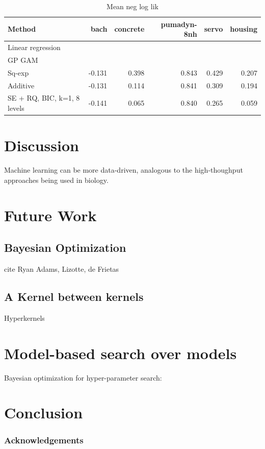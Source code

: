 \documentclass[twoside]{article}
\theoremstyle{definition}
\theoremstyle{remark}
\numberwithin{equation}{section}
\numberwithin{thm}{section}
\begin{document}
\begin{table}[h!]
\begin{center}
\begin{tabular}{l | r r r r r}
Method & bach & concrete & pumadyn-8nh & servo & housing \\
\hline
Linear regression & & & & & \\
GP GAM & & & & & \\
Sq-exp & -0.131 & 0.398 & 0.843 & 0.429 & 0.207 \\
Additive & -0.131 & 0.114 & 0.841 & 0.309 & 0.194 \\
\hline
SE + RQ, BIC, k=1, 8 levels & -0.141 & 0.065 & 0.840 & 0.265 & 0.059\\
\end{tabular}
\caption{Mean neg log lik}
\end{center}
\end{table}

\section{Discussion}

Machine learning can be more data-driven, analogous to the high-thoughput approaches being used in biology. 

\section{Future Work}
\subsection{Bayesian Optimization}

cite Ryan Adams, Lizotte, de Frietas

\subsection{A Kernel between kernels}

Hyperkernels \cite{ong2002hyperkernels}
\section{Model-based search over models}

Bayesian optimization for hyper-parameter search: \cite{snoek2012practical}


\section{Conclusion}

\subsubsection*{Acknowledgements}




\end{document}
